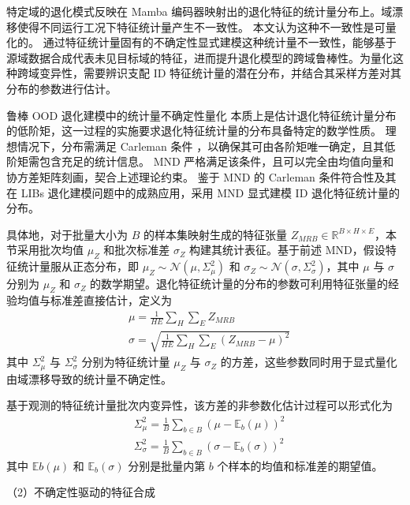 特定域的退化模式反映在 Mamba 编码器映射出的退化特征的统计量分布上。域漂移使得不同运行工况下特征统计量产生不一致性。
本文认为这种不一致性是可量化的。
% 
通过特征统计量固有的不确定性显式建模这种统计量不一致性，能够基于源域数据合成代表未见目标域的特征，进而提升退化模型的跨域鲁棒性。为量化这种跨域变异性，需要辨识支配 ID 特征统计量的潜在分布，并结合其采样方差对其分布的参数进行估计。

鲁棒 OOD 退化建模中的统计量不确定性量化
本质上是估计退化特征统计量分布的低阶矩，这一过程的实施要求退化特征统计量的分布具备特定的数学性质。
理想情况下，分布需满足 Carleman 条件 \cite{akhiezer2020classical}，以确保其可由各阶矩唯一确定，且其低阶矩需包含充足的统计信息。
MND 严格满足该条件，且可以完全由均值向量和协方差矩阵刻画，契合上述理论约束。
鉴于 MND 的 Carleman 条件符合性及其在 LIBs 退化建模问题中的成熟应用，采用 MND 显式建模 ID 退化特征统计量的分布。

具体地，对于批量大小为 $B$ 的样本集映射生成的特征张量 $Z_{MRB} \in \mathbb{R}^{B \times H \times E}$，本节采用批次均值 $\mu_{Z}$ 和批次标准差 $\sigma_{Z}$ 构建其统计表征。基于前述 MND，假设特征统计量服从正态分布，即 $\mu_{Z} \sim \mathcal{N}(\mu, \Sigma_{\mu}^{2})$ 和 $\sigma_{Z} \sim \mathcal{N}(\sigma, \Sigma_{\sigma}^{2})$，其中 $\mu$ 与 $\sigma$ 分别为 $\mu_{Z}$ 和 $\sigma_{Z}$ 的数学期望。退化特征统计量的分布的参数可利用特征张量的经验均值与标准差直接估计，定义为
% 
\begin{align}
    & \mu=\frac{1}{HE}\sum_{H}\sum_{E}Z_{MRB} \\
    & \sigma = \sqrt{\frac{1}{HE}\sum_{H}\sum_{E}(Z_{MRB} - \mu)^{2}}
\end{align}
% 
其中 $\Sigma_{\mu}^{2}$ 与 $\Sigma_{\sigma}^{2}$ 分别为特征统计量 $\mu_{Z}$ 与 $\sigma_{Z}$ 的方差，这些参数同时用于显式量化由域漂移导致的统计量不确定性。

基于观测的特征统计量批次内变异性，该方差的非参数化估计过程可以形式化为
% 
\begin{align}
    & \Sigma_{\mu}^{2}=\frac{1}{B}\sum_{b\in B}(\mu-\mathbb{E}_{b}(\mu))^{2} \\
    & \Sigma_{\sigma}^{2} = \frac{1}{B}\sum_{b\in B}(\sigma-\mathbb{E}_{b}(\sigma))^{2}
\end{align}
% 
其中 $ \mathbb{E}{b}(\mu) $ 和 $ \mathbb{E}_{b}(\sigma) $ 分别是批量内第 $b$ 个样本的均值和标准差的期望值。

（2）不确定性驱动的特征合成


